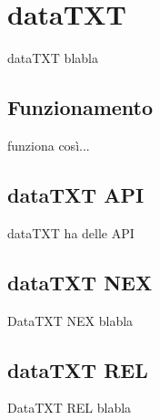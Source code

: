 \chapter{dataTXT}
dataTXT blabla

\section{Funzionamento}
	funziona così...

\section{dataTXT API}
	dataTXT ha delle API

	\section{dataTXT NEX}
		DataTXT NEX blabla

	\section{dataTXT REL}
		DataTXT REL blabla